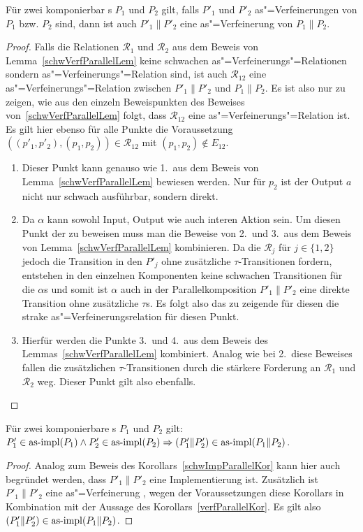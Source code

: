 \begin{Kor}
  \label{verfParallelKor}
  Für zwei komponierbar \MEIO{}s $P_1$ und $P_2$ gilt, falls $P'_1$ und $P'_2$
  as"=Verfeinerungen von $P_1$ bzw. $P_2$ sind, dann ist auch $P'_1\|P'_2$ eine
  as"=Verfeinerung von $P_1\|P_2$.
\end{Kor}
\begin{proof}
  Falls die Relationen $\mathcal{R}_1$ und $\mathcal{R}_2$ aus dem Beweis von
  Lemma~\ref{schwVerfParallelLem} keine schwachen as"=Verfeinerungs"=Relationen
  sondern as"=Verfeinerungs"=Relation sind, ist auch $\mathcal{R}_{12}$ eine
  as"=Verfeinerungs"=Relation zwischen $P'_1\|P'_2$ und $P_1\|P_2$. Es ist also
  nur zu zeigen, wie aus den einzeln Beweispunkten des Beweises
  von~\ref{schwVerfParallelLem} folgt, dass $\mathcal{R}_{12}$ eine
  as"=Verfeinerungs"=Relation ist. Es gilt hier ebenso für alle Punkte die
  Voraussetzung $((p'_1,p'_2),(p_1,p_2))\in\mathcal{R}_{12}$ mit
  $(p_1,p_2)\notin E_{12}$.
  \begin{enumerate}
    \item Dieser Punkt kann genauso wie 1.\ aus dem Beweis von
      Lemma~\ref{schwVerfParallelLem} bewiesen werden. Nur für $p_2$ ist der
      Output $a$ nicht nur schwach ausführbar, sondern direkt.
    \item Da $\alpha$ kann sowohl Input, Output wie auch interen Aktion sein.
      Um diesen Punkt der zu beweisen muss man die Beweise von 2.\ und 3.\ aus
      dem Beweis von Lemma~\ref{schwVerfParallelLem} kombinieren. Da die
      $\mathcal{R}_j$ für $j\in\{1,2\}$ jedoch die Transition in den $P'_j$
      ohne zusätzliche $\tau$-Transitionen fordern, entstehen in den einzelnen
      Komponenten keine schwachen Transitionen für die $\alpha$s und somit ist
      $\alpha$ auch in der Parallelkomposition $P'_1\|P'_2$ eine direkte
      Transition ohne zusätzliche $\tau$s. Es folgt also das zu zeigende für
      diesen die strake as"=Verfeinerungsrelation für diesen Punkt.
    \item Hierfür werden die Punkte 3.\ und 4.\ aus dem Beweis des
      Lemmas~\ref{schwVerfParallelLem} kombiniert. Analog wie bei 2.\ diese
      Beweises fallen die zusätzlichen $\tau$-Transitionen durch die stärkere
      Forderung an $\mathcal{R}_1$ und $\mathcal{R}_2$ weg. Dieser Punkt gilt
      also ebenfalls.
  \end{enumerate}
\end{proof}

\begin{Kor}
  Für zwei komponierbare \MEIO{}s $P_1$ und $P_2$ gilt:
  $P'_1\in\mathrm{as}\text{-}\mathrm{impl} (P_1) \land P'_2 \in\mathrm{as}\text{-}\mathrm{impl} (P_2) \Rightarrow (P'_1\|P'_2)
  \in\mathrm{as}\text{-}\mathrm{impl} (P_1\|P_2)$.
\end{Kor}
\begin{proof}
  Analog zum Beweis des Korollars~\ref{schwImpParallelKor} kann hier auch
  begründet werden, dass $P'_1\|P'_2$ eine Implementierung ist. Zusätzlich
  ist $P'_1\|P'_2$ eine as"=Verfeinerung , wegen der Voraussetzungen diese
  Korollars in Kombination mit der Aussage des Korollars~\ref{verfParallelKor}.
  Es gilt also $(P'_1\|P'_2)\in\mathrm{as}\text{-}\mathrm{impl} (P_1\|P_2)$.
\end{proof}

